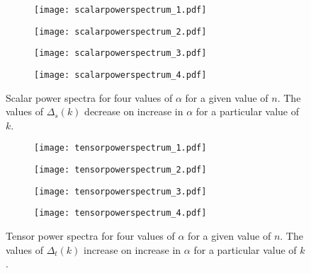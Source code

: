 \documentclass[a4paper,11pt]{article}
\begin{document}
 \begin{figure}[H]
\begin{subfigure}{0.52\linewidth}
  \centering
   \texttt{[image: scalarpowerspectrum\_1.pdf]} 
   \subcaption{}
   \label{fig:scalarPowerSpectrum_1}
\end{subfigure}%
\begin{subfigure}{0.52\linewidth}
  \centering
   \texttt{[image: scalarpowerspectrum\_2.pdf]}
   \subcaption{}
   \label{fig:scalarPowerSpectrum_2}
\end{subfigure}%
\vspace{0.1\linewidth}
\begin{subfigure}{0.52\linewidth}
  \centering
   \texttt{[image: scalarpowerspectrum\_3.pdf]}
   \subcaption{}
    \label{fig:scalarPowerSpectrum_3}
\end{subfigure}%
\begin{subfigure}{0.52\linewidth}
  \centering
   \texttt{[image: scalarpowerspectrum\_4.pdf]}
   \subcaption{}
    \label{fig:scalarPowerSpectrum_4}
\end{subfigure}
\caption{Scalar power spectra for four values of $\alpha$ for a given value of $n$. The values of $\Delta_s(k)$ decrease on increase in $\alpha$ for a particular value of $k$.}
\label{fig:scalarPowerSpectrum}
\end{figure}
 \begin{figure}[H]
\begin{subfigure}{0.52\linewidth}
  \centering
   \texttt{[image: tensorpowerspectrum\_1.pdf]} 
   \subcaption{}
   \label{fig:tensorPowerSpectrum_1}
\end{subfigure}%
\begin{subfigure}{0.52\linewidth}
  \centering
   \texttt{[image: tensorpowerspectrum\_2.pdf]}
   \subcaption{}
   \label{fig:tensorPowerSpectrum_2}
\end{subfigure}%
\vspace{0.1\linewidth}
\begin{subfigure}{0.52\linewidth}
  \centering
   \texttt{[image: tensorpowerspectrum\_3.pdf]}
   \subcaption{}
    \label{fig:tensorPowerSpectrum_3}
\end{subfigure}%
\begin{subfigure}{0.52\linewidth}
  \centering
   \texttt{[image: tensorpowerspectrum\_4.pdf]}
   \subcaption{}
    \label{fig:tensorPowerSpectrum_4}
\end{subfigure}
\caption{Tensor power spectra for four values of $\alpha$ for a given value of $n$. The values of $\Delta_t(k)$ increase on increase in $\alpha$ for a particular value of $k$.}
\label{fig:tensorPowerSpectrum}
\end{figure}
\end{document}
